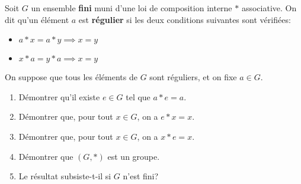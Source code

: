 \documentclass{report}
\begin{document}
\newpage
\qs{}
{
Soit $G$ un ensemble \textbf{fini} muni d'une loi de composition interne $*$
associative. On dit qu'un élément $a$ est \textbf{régulier} si les deux
conditions suivantes sont vérifiées:
\begin{itemize}
  \item $a * x = a * y \implies x = y$
  \item $x *a  = y * a \implies x = y$
\end{itemize}
On suppose que tous les éléments de $G$ sont réguliers, et on fixe $a\in G$.

\begin{enumerate}
  \item Démontrer qu'il existe $e\in G$ tel que $a*e = a$.\\[2pt]
  \item Démontrer que, pour tout $x\in G$, on a $e*x = x$.\\[2pt]
  \item Démontrer que, pour tout $x\in G$, on a $x*e = x$.\\[2pt]
  \item Démontrer que $\left(G, *\right)$ est un groupe.
  \item Le résultat subsiste-t-il si $G$ n'est fini?
\end{enumerate}
}
\end{document}
